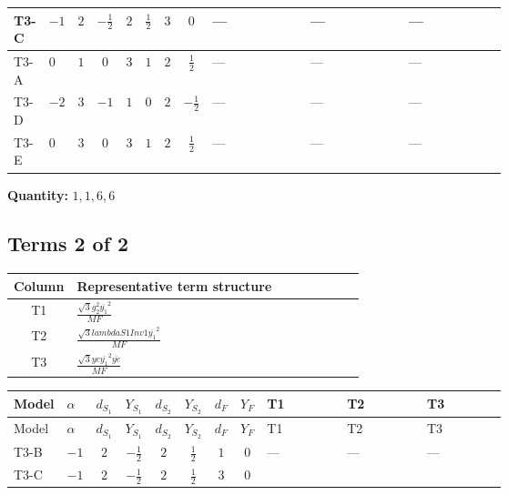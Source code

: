 \documentclass[8pt]{article}
\begin{document}
\begin{landscape}
\begin{longtable}{@{}llcccccc >{\raggedright\arraybackslash}p{0.21\linewidth} >{\raggedright\arraybackslash}p{0.21\linewidth} >{\raggedright\arraybackslash}p{0.21\linewidth}@{}}
\midrule
T3-C & $-1$ & $2$ & $-\frac{1}{2}$ & $2$ & $\frac{1}{2}$ & $3$ & $0$ & --- & --- & --- \\
\midrule
T3-A & $0$ & $1$ & $0$ & $3$ & $1$ & $2$ & $\frac{1}{2}$ & --- & --- & --- \\
\midrule
T3-D & $-2$ & $3$ & $-1$ & $1$ & $0$ & $2$ & $-\frac{1}{2}$ & --- & --- & --- \\
\midrule
T3-E & $0$ & $3$ & $0$ & $3$ & $1$ & $2$ & $\frac{1}{2}$ & --- & --- & --- \\
\midrule
\bottomrule
\end{longtable}
\clearpage
\noindent\textbf{Quantity: }$\mathrm{1,1,6,6}$\par\smallskip
\subsection*{Terms 2 of 2}
\begin{center}
\begin{tabular}{@{}c >{\raggedright\arraybackslash}p{0.82\linewidth}@{}}
\toprule
Column & Representative term structure \\
\midrule
T1 & \(\displaystyle \frac{\sqrt{3} g_{2}^{2} \overline{y_{1}}^{2}}{MF}\) \\
\midrule
T2 & \(\displaystyle \frac{\sqrt{3} lambdaS1Inv1 \overline{y_{1}}^{2}}{MF}\) \\
\midrule
T3 & \(\displaystyle \frac{\sqrt{3} ye \overline{y_{1}}^{2} \overline{ye}}{MF}\) \\
\midrule
\bottomrule
\end{tabular}
\end{center}
\smallskip
\tiny
\begin{longtable}{@{}llcccccc >{\raggedright\arraybackslash}p{0.21\linewidth} >{\raggedright\arraybackslash}p{0.21\linewidth} >{\raggedright\arraybackslash}p{0.21\linewidth}@{}}
\toprule
Model & $\alpha$ & $d_{S_1}$ & $Y_{S_1}$ & $d_{S_2}$ & $Y_{S_2}$ & $d_F$ & $Y_F$ & T1 & T2 & T3 \\
\midrule
\endfirsthead
\toprule
Model & $\alpha$ & $d_{S_1}$ & $Y_{S_1}$ & $d_{S_2}$ & $Y_{S_2}$ & $d_F$ & $Y_F$ & T1 & T2 & T3 \\
\midrule
\endhead
T3-B & $-1$ & $2$ & $-\frac{1}{2}$ & $2$ & $\frac{1}{2}$ & $1$ & $0$ & --- & --- & --- \\
\midrule
T3-C & $-1$ & $2$ & $-\frac{1}{2}$ & $2$ & $\frac{1}{2}$ & $3$ & $0$ & \scriptsize\adjustbox{max width=\linewidth}{$\begin{gathered} \frac{\sqrt{3} g_{2}^{2} \overline{y_{1}}^{2}}{4 MF}\end{gathered}$} & \scriptsize\adjustbox{max width=\linewidth}{$\begin{gathered} \frac{\sqrt{3} lambdaS1Inv1 \overline{y_{1}}^{2}}{6 MF}\end{gathered}$} & \scriptsize\adjustbox{max width=\linewidth}{$\begin{gathered} - \frac{\sqrt{3} ye \overline{y_{1}}^{2} \overline{ye}}{12 MF}\end{gathered}$} \\

\end{longtable}
\end{landscape}
\end{document}
